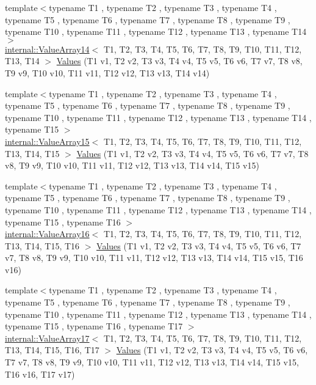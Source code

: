 \begin{DoxyCompactItemize}
\item 
{\footnotesize template$<$typename T1 , typename T2 , typename T3 , typename T4 , typename T5 , typename T6 , typename T7 , typename T8 , typename T9 , typename T10 , typename T11 , typename T12 , typename T13 , typename T14 $>$ }\\\mbox{\hyperlink{classtesting_1_1internal_1_1ValueArray14}{internal\+::\+Value\+Array14}}$<$ T1, T2, T3, T4, T5, T6, T7, T8, T9, T10, T11, T12, T13, T14 $>$ \mbox{\hyperlink{namespacetesting_a2d00ed785e0e796e6f36dc79c051dc76}{Values}} (T1 v1, T2 v2, T3 v3, T4 v4, T5 v5, T6 v6, T7 v7, T8 v8, T9 v9, T10 v10, T11 v11, T12 v12, T13 v13, T14 v14)
\item 
{\footnotesize template$<$typename T1 , typename T2 , typename T3 , typename T4 , typename T5 , typename T6 , typename T7 , typename T8 , typename T9 , typename T10 , typename T11 , typename T12 , typename T13 , typename T14 , typename T15 $>$ }\\\mbox{\hyperlink{classtesting_1_1internal_1_1ValueArray15}{internal\+::\+Value\+Array15}}$<$ T1, T2, T3, T4, T5, T6, T7, T8, T9, T10, T11, T12, T13, T14, T15 $>$ \mbox{\hyperlink{namespacetesting_ab0c1943e4f680df0d92c695ed0ac36df}{Values}} (T1 v1, T2 v2, T3 v3, T4 v4, T5 v5, T6 v6, T7 v7, T8 v8, T9 v9, T10 v10, T11 v11, T12 v12, T13 v13, T14 v14, T15 v15)
\item 
{\footnotesize template$<$typename T1 , typename T2 , typename T3 , typename T4 , typename T5 , typename T6 , typename T7 , typename T8 , typename T9 , typename T10 , typename T11 , typename T12 , typename T13 , typename T14 , typename T15 , typename T16 $>$ }\\\mbox{\hyperlink{classtesting_1_1internal_1_1ValueArray16}{internal\+::\+Value\+Array16}}$<$ T1, T2, T3, T4, T5, T6, T7, T8, T9, T10, T11, T12, T13, T14, T15, T16 $>$ \mbox{\hyperlink{namespacetesting_afebcdc503d4a99cae5924523dcfd02e1}{Values}} (T1 v1, T2 v2, T3 v3, T4 v4, T5 v5, T6 v6, T7 v7, T8 v8, T9 v9, T10 v10, T11 v11, T12 v12, T13 v13, T14 v14, T15 v15, T16 v16)
\item 
{\footnotesize template$<$typename T1 , typename T2 , typename T3 , typename T4 , typename T5 , typename T6 , typename T7 , typename T8 , typename T9 , typename T10 , typename T11 , typename T12 , typename T13 , typename T14 , typename T15 , typename T16 , typename T17 $>$ }\\\mbox{\hyperlink{classtesting_1_1internal_1_1ValueArray17}{internal\+::\+Value\+Array17}}$<$ T1, T2, T3, T4, T5, T6, T7, T8, T9, T10, T11, T12, T13, T14, T15, T16, T17 $>$ \mbox{\hyperlink{namespacetesting_a5cb89ee5c491cbe65de523f9f1bc1987}{Values}} (T1 v1, T2 v2, T3 v3, T4 v4, T5 v5, T6 v6, T7 v7, T8 v8, T9 v9, T10 v10, T11 v11, T12 v12, T13 v13, T14 v14, T15 v15, T16 v16, T17 v17)

\end{DoxyCompactItemize}
